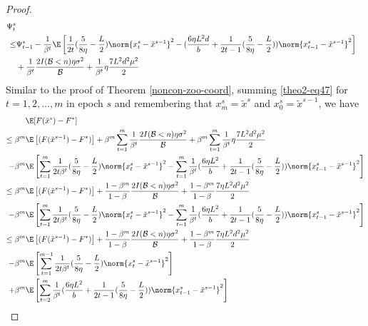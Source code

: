 \begin{proof}
\begin{align} 
\Psi_t^s \notag
\\ \leq& \Psi_{t-1}^s - \frac{1}{\beta^t}\E\left[ \frac{1}{2t}(\frac{5}{8\eta} - \frac{L}{2})\norm{{x}_t^s-\tilde{x}^{s-1}}^2-(\frac{6\eta L^2 d}{b}+\frac{1}{2t-1}(\frac{5}{8\eta} - \frac{L}{2}))\norm{x_{t-1}^s-\tilde{x}^{s-1}}^2\right]\notag\\
&+ \frac{1}{\beta^t}\frac{2I(\mathcal{B} < n)\eta \sigma ^2}{\mathcal{B}}+\frac{1}{\beta^t}\eta \frac{7 L^2 d^2 \mu^2}{2}\label{theo2-eq47}
 \end{align}
Similar to the proof of Theorem \ref{noncon-zoo-coord}, summing \eqref{theo2-eq47} for $t=1, 2, \ldots, m$ in epoch $s$ and remembering that $x_m^s = \tilde{x}^s$ and $x_0^s = \tilde{x}^{s-1}$, we have 
\begin{align}
\E&[F(\tilde{x}^s)-F^*]\notag\\
\leq\beta^m\E&\left[(F(\tilde{x}^{s-1}) - F^*)\right] +\beta^m\sum_{t=1}^m \frac{1}{\beta^t}\frac{2I(\mathcal{B} < n)\eta \sigma ^2}{\mathcal{B}}+\beta^m\sum_{t=1}^m \frac{1}{\beta^t}\eta \frac{7 L^2 d^2 \mu^2}{2}\notag
\\-\beta^m\E&\left[\sum_{t=1}^m\frac{1}{2t\beta^t}(\frac{5}{8\eta} - \frac{L}{2})\norm{{x}_t^s-\tilde{x}^{s-1}}^2-\sum_{t=1}^m\frac{1}{\beta^t}(\frac{6 \eta L^2 }{b}+\frac{1}{2t-1}(\frac{5}{8\eta} - \frac{L}{2})) \norm{x_{t-1}^s-\tilde{x}^{s-1}}^2 \right]\notag\\
\leq\beta^m\E&\left[(F(\tilde{x}^{s-1}) - F^*)\right] + \frac{1-\beta^m}{1-\beta}\frac{2I(\mathcal{B} < n)\eta \sigma ^2}{\mathcal{B}}+\frac{1-\beta^m}{1-\beta} \frac{7 \eta L^2 d^2 \mu^2}{2}\notag
\\-\beta^m\E&\left[\sum_{t=1}^m\frac{1}{2t\beta^t}(\frac{5}{8\eta} - \frac{L}{2})\norm{{x}_t^s-\tilde{x}^{s-1}}^2-\sum_{t=1}^m\frac{1}{\beta^t}(\frac{6\eta L^2 }{b}+\frac{1}{2t-1}(\frac{5}{8\eta} - \frac{L}{2})) \norm{x_{t-1}^s-\tilde{x}^{s-1}}^2 \right]\notag\\
\leq\beta^m\E&\left[(F(\tilde{x}^{s-1}) - F^*)\right] + \frac{1-\beta^m}{1-\beta}\frac{2I(\mathcal{B} < n)\eta \sigma ^2}{\mathcal{B}}+\frac{1-\beta^m}{1-\beta}\frac{7 \eta L^2 d^2 \mu^2}{2}\notag
\\-\beta^m\E&\left[\sum_{t=1}^{m-1}\frac{1}{2t\beta^t}(\frac{5}{8\eta} - \frac{L}{2})\norm{{x}_t^s-\tilde{x}^{s-1}}^2\right]\notag\\
+\beta^m\E&\left[\sum_{t=2}^m\frac{1}{\beta^t}(\frac{6\eta L^2}{b}+\frac{1}{2t-1}(\frac{5}{8\eta} - \frac{L}{2})) \norm{x_{t-1}^s-\tilde{x}^{s-1}}^2 \right]\label{eq48}\\

\end{align}
\end{proof}
